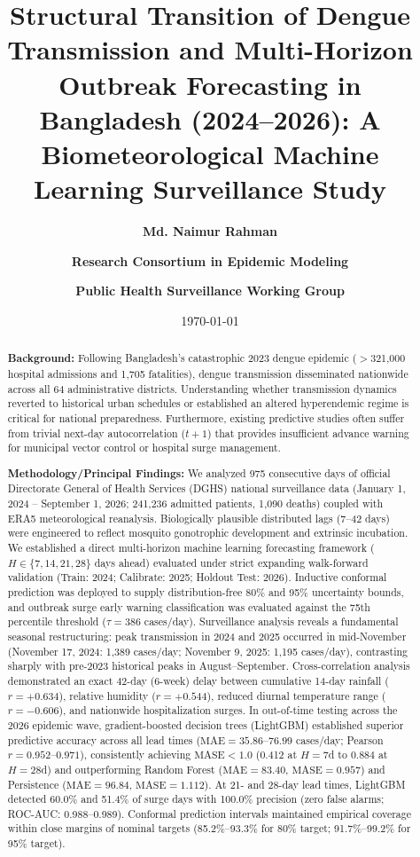 \documentclass[11pt,a4paper]{article}
\title{\textbf{\Large Structural Transition of Dengue Transmission and Multi-Horizon Outbreak Forecasting in Bangladesh (2024--2026): A Biometeorological Machine Learning Surveillance Study}}
\author[1,*]{\textbf{Md. Naimur Rahman}}
\author[1]{\textbf{Research Consortium in Epidemic Modeling}}
\author[2]{\textbf{Public Health Surveillance Working Group}}
\affil[1]{Department of Public Health and Informatics, Data Science and Epidemiology Division, Dhaka, Bangladesh}
\affil[2]{Directorate General of Health Services (DGHS) Affiliated Research Network, Dhaka, Bangladesh}
\affil[*]{Corresponding author: \texttt{naimur.research@gmail.com}}
\date{\today}
\begin{document}
\maketitle
\linenumbers

\begin{abstract}
\noindent\textbf{Background:} Following Bangladesh's catastrophic 2023 dengue epidemic ($>$321,000 hospital admissions and 1,705 fatalities), dengue transmission disseminated nationwide across all 64 administrative districts. Understanding whether transmission dynamics reverted to historical urban schedules or established an altered hyperendemic regime is critical for national preparedness. Furthermore, existing predictive studies often suffer from trivial next-day autocorrelation ($t+1$) that provides insufficient advance warning for municipal vector control or hospital surge management.

\vspace{0.5em}
\noindent\textbf{Methodology/Principal Findings:} We analyzed 975 consecutive days of official Directorate General of Health Services (DGHS) national surveillance data (January 1, 2024 -- September 1, 2026; 241,236 admitted patients, 1,090 deaths) coupled with ERA5 meteorological reanalysis. Biologically plausible distributed lags (7--42 days) were engineered to reflect mosquito gonotrophic development and extrinsic incubation. We established a direct multi-horizon machine learning forecasting framework ($H \in \{7, 14, 21, 28\}$ days ahead) evaluated under strict expanding walk-forward validation (Train: 2024; Calibrate: 2025; Holdout Test: 2026). Inductive conformal prediction was deployed to supply distribution-free 80\% and 95\% uncertainty bounds, and outbreak surge early warning classification was evaluated against the 75th percentile threshold ($\tau = 386$ cases/day). Surveillance analysis reveals a fundamental seasonal restructuring: peak transmission in 2024 and 2025 occurred in mid-November (November 17, 2024: 1,389 cases/day; November 9, 2025: 1,195 cases/day), contrasting sharply with pre-2023 historical peaks in August--September. Cross-correlation analysis demonstrated an exact 42-day (6-week) delay between cumulative 14-day rainfall ($r = +0.634$), relative humidity ($r = +0.544$), reduced diurnal temperature range ($r = -0.606$), and nationwide hospitalization surges. In out-of-time testing across the 2026 epidemic wave, gradient-boosted decision trees (LightGBM) established superior predictive accuracy across all lead times ($\text{MAE} = 35.86$--$76.99$ cases/day; Pearson $r = 0.952$--$0.971$), consistently achieving $\text{MASE} < 1.0$ (0.412 at $H=7$d to 0.884 at $H=28$d) and outperforming Random Forest ($\text{MAE} = 83.40$, $\text{MASE} = 0.957$) and Persistence ($\text{MAE} = 96.84$, $\text{MASE} = 1.112$). At 21- and 28-day lead times, LightGBM detected 60.0\% and 51.4\% of surge days with 100.0\% precision (zero false alarms; ROC-AUC: 0.988--0.989). Conformal prediction intervals maintained empirical coverage within close margins of nominal targets (85.2\%--93.3\% for 80\% target; 91.7\%--99.2\% for 95\% target).


\end{abstract}
\end{document}

